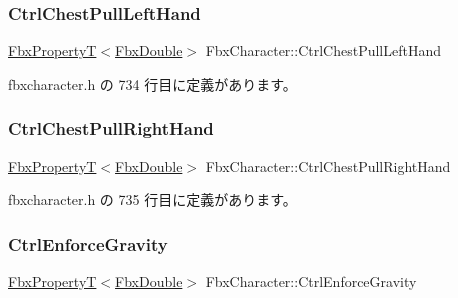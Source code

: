 \mbox{\label{class_fbx_character_a0b14fa3eedf09891f8b26348c44ba0a2}} 
\subsubsection{\texorpdfstring{Ctrl\+Chest\+Pull\+Left\+Hand}{CtrlChestPullLeftHand}}
{\footnotesize\ttfamily \hyperlink{class_fbx_property_t}{Fbx\+PropertyT}$<$\hyperlink{fbxtypes_8h_a171e72a1c46fc15c1a6c9c31948c1c5b}{Fbx\+Double}$>$ Fbx\+Character\+::\+Ctrl\+Chest\+Pull\+Left\+Hand}



 fbxcharacter.\+h の 734 行目に定義があります。

\mbox{\label{class_fbx_character_a940ece5e038794193daa2c32e3d7c3b1}} 
\subsubsection{\texorpdfstring{Ctrl\+Chest\+Pull\+Right\+Hand}{CtrlChestPullRightHand}}
{\footnotesize\ttfamily \hyperlink{class_fbx_property_t}{Fbx\+PropertyT}$<$\hyperlink{fbxtypes_8h_a171e72a1c46fc15c1a6c9c31948c1c5b}{Fbx\+Double}$>$ Fbx\+Character\+::\+Ctrl\+Chest\+Pull\+Right\+Hand}



 fbxcharacter.\+h の 735 行目に定義があります。

\mbox{\label{class_fbx_character_a45dd614ee3bd42e3324a76f627cd991e}} 
\subsubsection{\texorpdfstring{Ctrl\+Enforce\+Gravity}{CtrlEnforceGravity}}
{\footnotesize\ttfamily \hyperlink{class_fbx_property_t}{Fbx\+PropertyT}$<$\hyperlink{fbxtypes_8h_a171e72a1c46fc15c1a6c9c31948c1c5b}{Fbx\+Double}$>$ Fbx\+Character\+::\+Ctrl\+Enforce\+Gravity}



